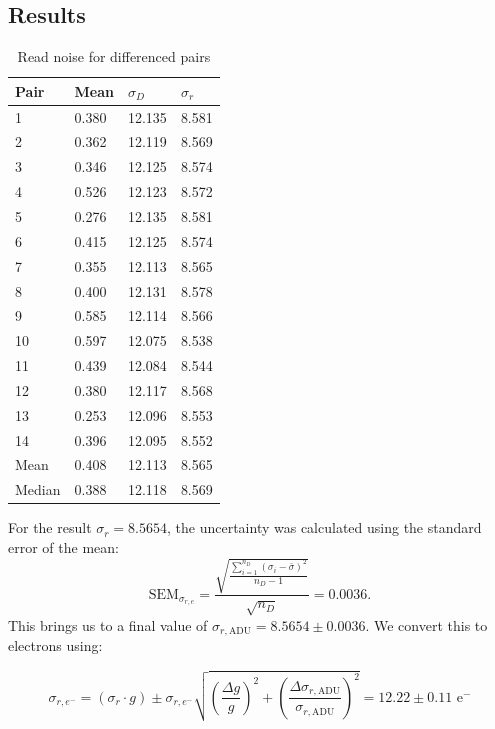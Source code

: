 \documentclass[12pt, letterpaper]{article}
\begin{document}
\subsection{Results}
\label{readnoisecalc}

\begin{table}[hbtp!]
    \centering
    \begin{tabular}{l lll} 
        \toprule
        Pair& Mean  &$\sigma_D$ &$\sigma_r$\\
        \midrule
        1 & 0.380  &12.135 &8.581\\
        2 & 0.362  &12.119 &8.569\\
        3 & 0.346  &12.125 &8.574\\
        4 & 0.526  &12.123 &8.572\\
        5 & 0.276  &12.135 &8.581\\
        6 & 0.415  &12.125 &8.574\\
        7 & 0.355  &12.113 &8.565\\
        8 & 0.400  &12.131 &8.578\\
        9 & 0.585  &12.114 &8.566\\
        10 & 0.597  &12.075 &8.538\\
        11 & 0.439  &12.084 &8.544\\
        12 & 0.380  &12.117 &8.568\\
        13 & 0.253  &12.096 &8.553\\
        14 & 0.396  &12.095 &8.552\\
        \midrule
        Mean & 0.408  &12.113 &8.565\\
        Median & 0.388  &12.118 &8.569\\
        \bottomrule

    \end{tabular}
    \caption{Read noise for differenced pairs}
    \label{ReadNoiseTable}
\end{table}

For the result $\sigma_r = 8.5654$, the uncertainty was calculated using the standard error of the mean:
\[
\text{SEM}_{\sigma_{r, e}} = \frac{\sqrt{\frac{\sum_{i=1}^{n_D} (\sigma_i - \bar{\sigma})^2}{n_D-1}}} {\sqrt{n_D}} = 0.0036.
\]
This brings us to a final value of $\sigma_{r, \text{ADU}} = 8.5654 \pm 0.0036$. We convert this to electrons using:

\[
\sigma_{r, e^-} = (\sigma_r \cdot g) \pm \sigma_{r, e^-} \sqrt{\left(\frac{\Delta g}{g}\right)^2 + \left(\frac{\Delta \sigma_{r, \text{ADU}}}{\sigma_{r, \text{ADU}}}\right)^2} = \boxed{12.22 \pm 0.11 \text{ e}^-}
\]
\end{document}
